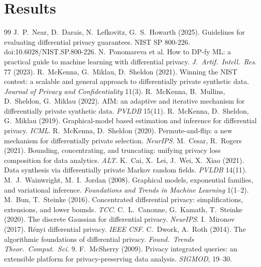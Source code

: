 \documentclass[11pt,a4paper]{article}
\theoremstyle{definition}
\theoremstyle{remark}
\begin{document}
\section{Results}\label{sec:results}


\begin{thebibliography}{99}\small
{} J.~P.~Near, D.~Darais, N.~Lefkovitz, G.~S.~Howarth (2025). Guidelines for evaluating differential privacy guarantees. NIST SP 800-226. doi:10.6028/NIST.SP.800-226.
 N.~Ponomareva et al. How to DP-fy ML: a practical guide to machine learning with differential privacy. \emph{J.\ Artif.\ Intell.\ Res.} 77 (2023).
 R.~McKenna, G.~Miklau, D.~Sheldon (2021). Winning the NIST contest: a scalable and general approach to differentially private synthetic data. \emph{Journal of Privacy and Confidentiality} 11(3).
 R.~McKenna, B.~Mullins, D.~Sheldon, G.~Miklau (2022). AIM: an adaptive and iterative mechanism for differentially private synthetic data. \emph{PVLDB} 15(11).
 R.~McKenna, D.~Sheldon, G.~Miklau (2019). Graphical-model based estimation and inference for differential privacy. \emph{ICML}.
 R.~McKenna, D.~Sheldon (2020). Permute-and-flip: a new mechanism for differentially private selection. \emph{NeurIPS}.
 M.~Cesar, R.~Rogers (2021). Bounding, concentrating, and truncating: unifying privacy loss composition for data analytics. \emph{ALT}.
 K.~Cai, X.~Lei, J.~Wei, X.~Xiao (2021). Data synthesis via differentially private Markov random fields. \emph{PVLDB} 14(11).
 M.~J.~Wainwright, M.~I.~Jordan (2008). Graphical models, exponential families, and variational inference. \emph{Foundations and Trends in Machine Learning} 1(1--2).
 M.~Bun, T.~Steinke (2016). Concentrated differential privacy: simplifications, extensions, and lower bounds. \emph{TCC}.
 C.~L.~Canonne, G.~Kamath, T.~Steinke (2020). The discrete Gaussian for differential privacy. \emph{NeurIPS}.
 I.~Mironov (2017). R\'enyi differential privacy. \emph{IEEE CSF}.
 C.~Dwork, A.~Roth (2014). The algorithmic foundations of differential privacy. \emph{Found.\ Trends Theor.\ Comput.\ Sci.} 9.
 F.~McSherry (2009). Privacy integrated queries: an extensible platform for privacy-preserving data analysis. \emph{SIGMOD}, 19--30.

\end{thebibliography}
\end{document}
